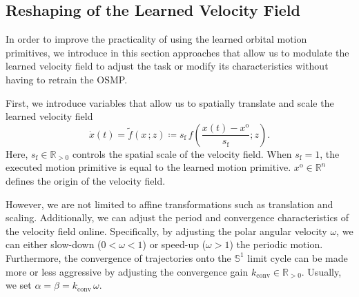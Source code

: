 \subsection{Reshaping of the Learned Velocity Field}
In order to improve the practicality of using the learned orbital motion primitives, we introduce in this section approaches that allow us to modulate the learned velocity field to adjust the task or modify its characteristics without having to retrain the \gls{OSMP}. 

First, we introduce variables that allow us to spatially translate and scale the learned velocity field
\begin{equation}
    \dot{x}(t) = \tilde{f}(x \, ;z) \coloneq s_\mathrm{f} \, f \left ( \frac{x(t)-x^\mathrm{o}}{s_\mathrm{f}}; z \right ).
\end{equation}
Here, $s_\mathrm{f} \in \mathbb{R}_{>0}$ controls the spatial scale of the velocity field. When $s_\mathrm{f} = 1$, the executed motion primitive is equal to the learned motion primitive. $x^\mathrm{o} \in \mathbb{R}^{n}$ defines the origin of the velocity field.

However, we are not limited to affine transformations such as translation and scaling. Additionally, we can adjust the period and convergence characteristics of the velocity field online. Specifically, by adjusting the polar angular velocity $\omega$, we can either slow-down ($0 < \omega < 1$) or speed-up ($\omega > 1$) the periodic motion.
Furthermore, the convergence of trajectories onto the $\mathbb{S}^1$ limit cycle can be made more or less aggressive by adjusting the convergence gain $k_\mathrm{conv} \in \mathbb{R}_{>0}$. Usually, we set $\alpha = \beta = k_\mathrm{conv} \, \omega$.

